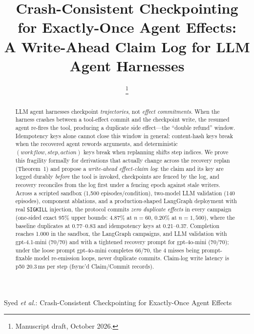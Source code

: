 \documentclass[10pt,journal,compsoc]{IEEEtran}
\begin{document}
\title{Crash-Consistent Checkpointing for Exactly-Once Agent Effects:\\
A Write-Ahead Claim Log for LLM Agent Harnesses}

\author{
\thanks{Manuscript draft, October 2026.}
}

%
{Syed \emph{et al.}: Crash-Consistent Checkpointing for Exactly-Once Agent Effects}

\maketitle

\begin{abstract}
LLM agent harnesses checkpoint \emph{trajectories}, not \emph{effect
commitments}. When the harness crashes between a tool-effect commit
and the checkpoint write, the resumed agent re-fires the tool,
producing a duplicate side effect---the ``double refund'' window.
Idempotency keys alone cannot close this window in general:
content-hash keys break when the recovered agent rewords arguments,
and deterministic $(\mathit{workflow},\mathit{step},
\mathit{action})$ keys break when replanning shifts step indices.
We prove this fragility formally for derivations that actually
change across the recovery replan (Theorem~1) and propose a
\emph{write-ahead effect-claim log}: the claim and its key are
logged durably \emph{before} the tool is invoked, checkpoints are
fenced by the log, and recovery reconciles from the log first under
a fencing epoch against stale writers. Across a scripted sandbox
(1,500 episodes/condition), two-model LLM validation (140 episodes),
component ablations, and a
production-shaped LangGraph deployment with real \texttt{SIGKILL}
injection, the protocol commits \emph{zero duplicate effects} in
every campaign (one-sided exact 95\% upper bounds: 4.87\% at
$n{=}60$, 0.20\% at $n{=}1{,}500$), where the baseline duplicates at
0.77--0.83 and idempotency keys at 0.21--0.37. Completion reaches
1.000 in the
sandbox, the LangGraph campaigns, and LLM validation with
gpt-4.1-mini (70/70) and with a tightened recovery prompt for
gpt-4o-mini (70/70); under the loose prompt gpt-4o-mini completes
66/70, the 4 misses being prompt-fixable model re-emission loops,
never duplicate commits. Claim-log write latency is p50 20.3\,ms
per step (fsync'd Claim/Commit records).
\end{abstract}
\end{document}
